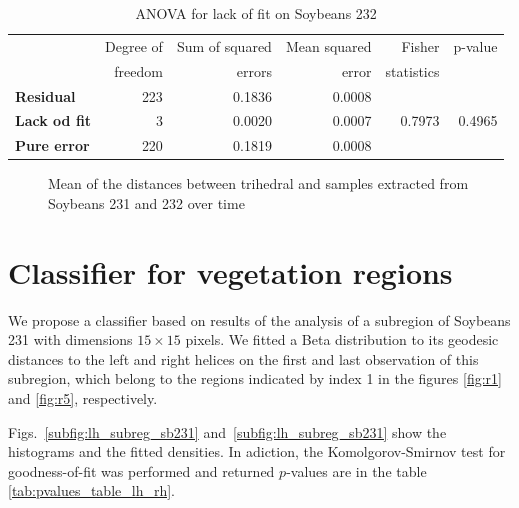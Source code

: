 \documentclass[12pt]{article}
\begin{document}
\begin{table}[hbt]
  \centering
  \caption{ANOVA for lack of fit on Soybeans 232}
  \label{tab:anova_sb232}
  \begin{tabular}{lrrrrr}
    \toprule
    & Degree of & Sum of squared & Mean squared & Fisher & p-value\\
    & freedom & errors & error & statistics &\\
    \cmidrule(lr){2-6}
    \textbf{Residual} & 223 & 0.1836 & 0.0008 & &\\
    \textbf{Lack od fit} & 3 & 0.0020 & 0.0007 & 0.7973 & 0.4965\\
    \textbf{Pure error} & 220 & 0.1819 & 0.0008 & &\\
    \bottomrule
  \end{tabular}
\end{table}

\begin{figure}[hbt]
  \caption{Mean of the distances between trihedral and samples extracted from Soybeans 231 and 232 over time}
  \label{fig:tri_mean_sb_231_232}
\end{figure}

\section{Classifier for vegetation regions}

We propose a classifier based on results of the analysis of a subregion of Soybeans 231 with dimensions $15\times 15$ pixels. 
We fitted a Beta distribution to its geodesic distances to the left and right helices on the first and last observation of this subregion, which belong to the regions indicated by index 1 in the figures \ref{fig:r1} and \ref{fig:r5}, respectively. 

Figs.~\ref{subfig:lh_subreg_sb231} and~\ref{subfig:lh_subreg_sb231} show the histograms and the fitted densities. 
In adiction, the Komolgorov-Smirnov test for goodness-of-fit was performed and returned $p$-values are in the table \ref{tab:pvalues_table_lh_rh}.
\end{document}
